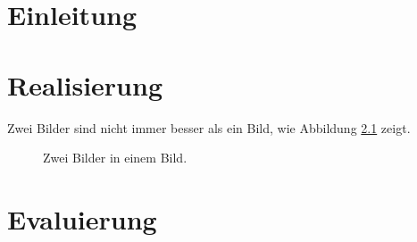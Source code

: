 \documentclass[a4paper]{book}
\begin{document}





\tableofcontents           %
\cleardoublepage
{}



\chapter{Einleitung}





\section{}





\chapter{Realisierung}

Zwei Bilder sind nicht immer besser als ein Bild, wie Abbildung
\ref{fig:ZweiBilder} zeigt.

\begin{figure}
\centering
{}
\hspace*{0.05\hsize}
\caption{Zwei Bilder in einem Bild.}
\label{fig:ZweiBilder}
\end{figure}



\chapter{Evaluierung}
\end{document}
